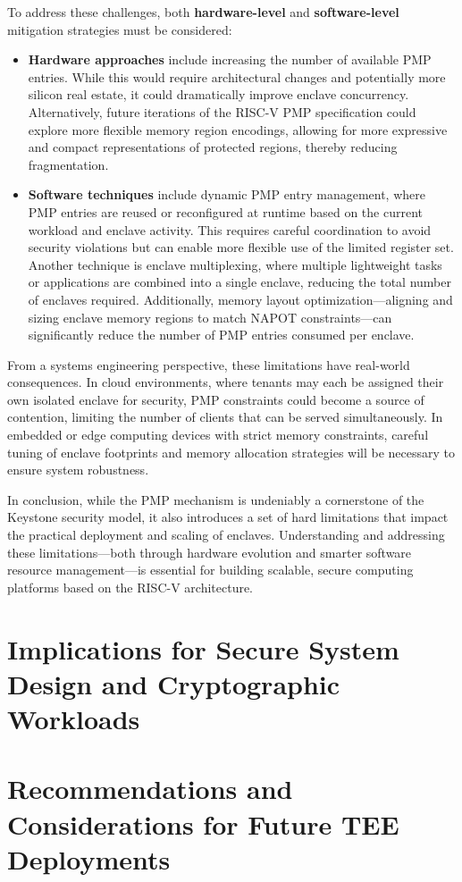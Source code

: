 To address these challenges, both \textbf{hardware-level} and \textbf{software-level} mitigation strategies must be considered:

\begin{itemize}
    \item \textbf{Hardware approaches} include increasing the number of available PMP entries. While this would require architectural changes and potentially more silicon real estate, it could dramatically improve enclave concurrency. Alternatively, future iterations of the RISC-V PMP specification could explore more flexible memory region encodings, allowing for more expressive and compact representations of protected regions, thereby reducing fragmentation.
    \item \textbf{Software techniques} include dynamic PMP entry management, where PMP entries are reused or reconfigured at runtime based on the current workload and enclave activity. This requires careful coordination to avoid security violations but can enable more flexible use of the limited register set. Another technique is enclave multiplexing, where multiple lightweight tasks or applications are combined into a single enclave, reducing the total number of enclaves required. Additionally, memory layout optimization—aligning and sizing enclave memory regions to match NAPOT constraints—can significantly reduce the number of PMP entries consumed per enclave.
\end{itemize}

From a systems engineering perspective, these limitations have real-world consequences. In cloud environments, where tenants may each be assigned their own isolated enclave for security, PMP constraints could become a source of contention, limiting the number of clients that can be served simultaneously. In embedded or edge computing devices with strict memory constraints, careful tuning of enclave footprints and memory allocation strategies will be necessary to ensure system robustness.

In conclusion, while the PMP mechanism is undeniably a cornerstone of the Keystone security model, it also introduces a set of hard limitations that impact the practical deployment and scaling of enclaves. Understanding and addressing these limitations—both through hardware evolution and smarter software resource management—is essential for building scalable, secure computing platforms based on the RISC-V architecture.

\section{Implications for Secure System Design and Cryptographic Workloads}

\section{Recommendations and Considerations for Future TEE Deployments}